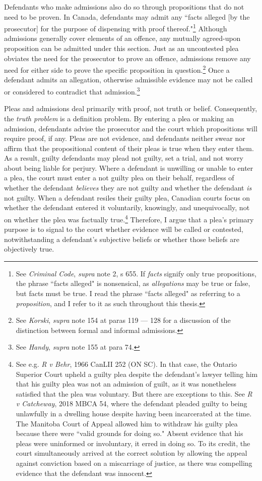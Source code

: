 Defendants who make admissions also do so through propositions that do not need to be proven. In Canada, defendants may admit any ``facts alleged [by the prosecutor] for the purpose of dispensing with proof thereof."\footnote{See \textit{Criminal Code}, \textit{supra} note 2, s 655. If \textit{facts} signify only true propositions, the phrase ``facts alleged" is nonsensical, as \textit{allegations} may be true or false, but facts must be true. I read the phrase ``facts alleged" as referring to a \textit{proposition}, and I refer to it as such throughout this thesis.} Although admissions generally cover elements of an offence, any mutually agreed-upon proposition can be admitted under this section. Just as an uncontested plea obviates the need for the prosecutor to prove an offence, admissions remove any need for either side to prove the specific proposition in question.\footnote{See \textit{Korski}, \textit{supra} note 154 at paras 119 — 128 for a discussion of the distinction between formal and informal admissions.} Once a defendant admits an allegation, otherwise admissible evidence may not be called or considered to contradict that admission.\footnote{See \textit{Handy}, \textit{supra} note 155 at para 74.}

Pleas and admissions deal primarily with proof, not truth or belief. Consequently, the \textit{truth problem} is a definition problem. By entering a plea or making an admission, defendants advise the prosecutor and the court which propositions will require proof, if any. Pleas are not evidence, and defendants neither swear nor affirm that the propositional content of their pleas is true when they enter them. As a result, guilty defendants may plead not guilty, set a trial, and not worry about being liable for perjury. Where a defendant is unwilling or unable to enter a plea, the court must enter a not guilty plea on their behalf, regardless of whether the defendant \textit{believes} they are not guilty and whether the defendant \textit{is} not guilty. When a defendant resiles their guilty plea, Canadian courts focus on whether the defendant entered it voluntarily, knowingly, and unequivocally, not on whether the plea was factually true.\footnote{See e.g. \textit{R v Behr}, 1966 CanLII 252 (ON SC). In that case, the Ontario Superior Court upheld a guilty plea despite the defendant's lawyer telling him that his guilty plea was not an admission of guilt, as it was nonetheless satisfied that the plea was voluntary. But there are exceptions to this. See \textit{R v Catcheway}, 2018 MBCA 54, where the defendant pleaded guilty to being unlawfully in a dwelling house despite having been incarcerated at the time. The Manitoba Court of Appeal allowed him to withdraw his guilty plea because there were ``valid grounds for doing so." Absent evidence that his pleas were uninformed or involuntary, it erred in doing so. To its credit, the court simultaneously arrived at the correct solution by allowing the appeal against conviction based on a miscarriage of justice, as there was compelling evidence that the defendant was innocent.} Therefore, I argue that a plea's primary purpose is to signal to the court whether evidence will be called or contested, notwithstanding a defendant's subjective beliefs or whether those beliefs are objectively true.

